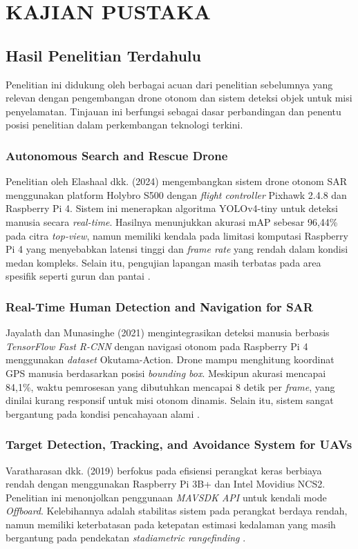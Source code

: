 \chapter{KAJIAN PUSTAKA}
\label{sec:chap2_kajian_pustaka}

\section{Hasil Penelitian Terdahulu}
Penelitian ini didukung oleh berbagai acuan dari penelitian sebelumnya yang relevan dengan pengembangan drone otonom dan sistem deteksi objek untuk misi penyelamatan. Tinjauan ini berfungsi sebagai dasar perbandingan dan penentu posisi penelitian dalam perkembangan teknologi terkini.

\subsection{Autonomous Search and Rescue Drone}
Penelitian oleh Elashaal dkk. (2024) mengembangkan sistem drone otonom SAR menggunakan platform Holybro S500 dengan \textit{flight controller} Pixhawk 2.4.8 dan Raspberry Pi 4. Sistem ini menerapkan algoritma YOLOv4-tiny untuk deteksi manusia secara \textit{real-time}. Hasilnya menunjukkan akurasi mAP sebesar 96,44\% pada citra \textit{top-view}, namun memiliki kendala pada limitasi komputasi Raspberry Pi 4 yang menyebabkan latensi tinggi dan \textit{frame rate} yang rendah dalam kondisi medan kompleks. Selain itu, pengujian lapangan masih terbatas pada area spesifik seperti gurun dan pantai \cite{Elashaal2024ASARD}.

\subsection{Real-Time Human Detection and Navigation for SAR}
Jayalath dan Munasinghe (2021) mengintegrasikan deteksi manusia berbasis \textit{TensorFlow Fast R-CNN} dengan navigasi otonom pada Raspberry Pi 4 menggunakan \textit{dataset} Okutama-Action. Drone mampu menghitung koordinat GPS manusia berdasarkan posisi \textit{bounding box}. Meskipun akurasi mencapai 84,1\%, waktu pemrosesan yang dibutuhkan mencapai 8 detik per \textit{frame}, yang dinilai kurang responsif untuk misi otonom dinamis. Selain itu, sistem sangat bergantung pada kondisi pencahayaan alami \cite{Jayalath2021DroneHumanID}.

\subsection{Target Detection, Tracking, and Avoidance System for UAVs}
Varatharasan dkk. (2019) berfokus pada efisiensi perangkat keras berbiaya rendah dengan menggunakan Raspberry Pi 3B+ dan Intel Movidius NCS2. Penelitian ini menonjolkan penggunaan \textit{MAVSDK API} untuk kendali mode \textit{Offboard}. Kelebihannya adalah stabilitas sistem pada perangkat berdaya rendah, namun memiliki keterbatasan pada ketepatan estimasi kedalaman yang masih bergantung pada pendekatan \textit{stadiametric rangefinding} \cite{Varatharasan2019TargetDetection}.

